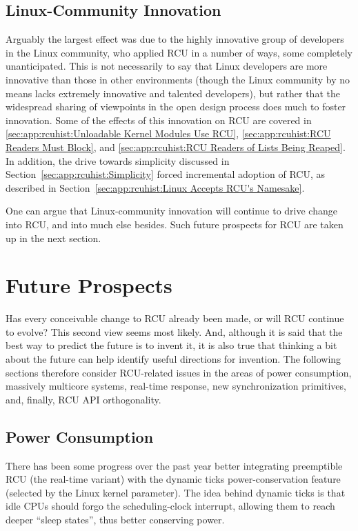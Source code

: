\subsection{Linux-Community Innovation}
\label{sec:app:rcuhist:Linux-Community Innovation}

Arguably the largest effect was due to the highly innovative group of
developers in the Linux community, who applied RCU in a number of
ways, some completely unanticipated.
This is not necessarily to say that Linux developers are more innovative
than those in other environments (though the Linux community by no means
lacks extremely innovative and talented developers), but rather that
the widespread sharing of viewpoints in the open design process does
much to foster innovation.
Some of the effects of this innovation on RCU are covered in
\ref{sec:app:rcuhist:Unloadable Kernel Modules Use RCU},
\ref{sec:app:rcuhist:RCU Readers Must Block}, and
\ref{sec:app:rcuhist:RCU Readers of Lists Being Reaped}.
In addition, the drive towards simplicity discussed in
Section~\ref{sec:app:rcuhist:Simplicity} forced incremental adoption of RCU,
as described in
Section~\ref{sec:app:rcuhist:Linux Accepts RCU's Namesake}.

One can argue that Linux-community innovation will continue to drive
change into RCU, and into much else besides.
Such future prospects for RCU are taken up in the next section.

\section{Future Prospects}
\label{sec:app:rcuhist:Future Prospects}

Has every conceivable change to RCU already been made,
or will RCU continue to evolve?
This second view seems most likely.
And, although it is said that the best way to predict the future is to
invent it, it is also true that thinking a bit about the future can
help identify useful directions for invention.
The following sections therefore consider RCU-related issues in the areas
of power consumption, massively multicore systems,
real-time response, new synchronization primitives,
and, finally,
RCU API orthogonality.

\subsection{Power Consumption}
\label{sec:app:rcuhist:Power Consumption}

There has been some progress over the past year better integrating
preemptible RCU (the real-time variant) with the dynamic ticks
power-conservation feature (selected by the
 Linux kernel parameter).
The idea behind dynamic ticks is that idle CPUs should forgo the
scheduling-clock interrupt, allowing them to reach deeper ``sleep
states'', thus better conserving power.

